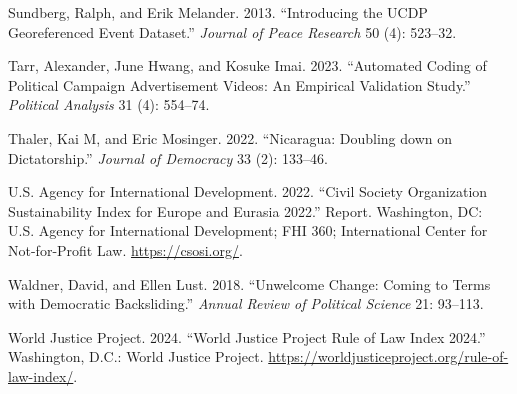 \documentclass[
  letterpaper,
  DIV=11,
  numbers=noendperiod]{scrartcl}
\newlength{\cslhangindent}
\newlength{\cslentryspacingunit} %
\newenvironment{CSLReferences}[2] %
 {%
  \setlength{\parindent}{0pt}
  \ifodd #1
  \let\oldpar\par
  \def\par{\hangindent=\cslhangindent\oldpar}
  \fi
  \setlength{\parskip}{#2\cslentryspacingunit}
 }%
 {}
\begin{document}
\begin{CSLReferences}{1}{0}
\leavevmode{}%
Sundberg, Ralph, and Erik Melander. 2013. {``Introducing the UCDP
Georeferenced Event Dataset.''} \emph{Journal of Peace Research} 50 (4):
523--32.

\leavevmode{}%
Tarr, Alexander, June Hwang, and Kosuke Imai. 2023. {``Automated Coding
of Political Campaign Advertisement Videos: An Empirical Validation
Study.''} \emph{Political Analysis} 31 (4): 554--74.

\leavevmode{}%
Thaler, Kai M, and Eric Mosinger. 2022. {``Nicaragua: Doubling down on
Dictatorship.''} \emph{Journal of Democracy} 33 (2): 133--46.

\leavevmode{}%
U.S. Agency for International Development. 2022. {``Civil Society
Organization Sustainability Index for Europe and Eurasia 2022.''}
Report. Washington, DC: U.S. Agency for International Development; FHI
360; International Center for Not-for-Profit Law.
\url{https://csosi.org/}.

\leavevmode{}%
Waldner, David, and Ellen Lust. 2018. {``Unwelcome Change: Coming to
Terms with Democratic Backsliding.''} \emph{Annual Review of Political
Science} 21: 93--113.

\leavevmode{}%
World Justice Project. 2024. {``World Justice Project Rule of Law Index
2024.''} Washington, D.C.: World Justice Project.
\url{https://worldjusticeproject.org/rule-of-law-index/}.

\end{CSLReferences}
\end{document}
